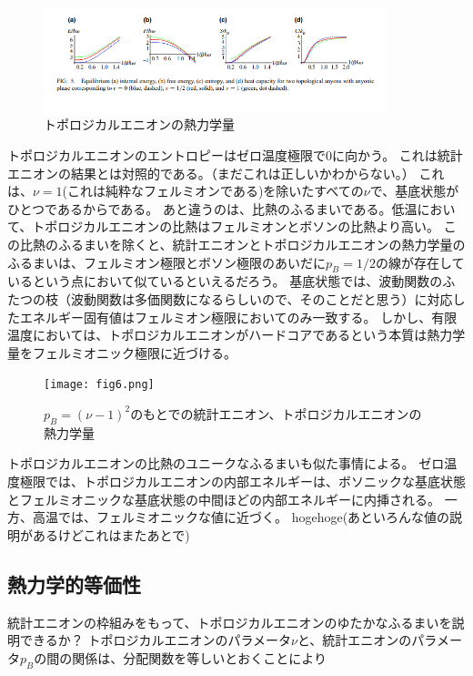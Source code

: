 \documentclass[a4paper,11pt]{jsarticle}
\numberwithin{equation}{section}
\begin{document}
\begin{figure}[htbp]
  \begin{center}
  \includegraphics[width=100mm]{fig5.png}
  \caption{トポロジカルエニオンの熱力学量}
  \end{center}
  \end{figure}

トポロジカルエニオンのエントロピーはゼロ温度極限で0に向かう。
これは統計エニオンの結果とは対照的である。（まだこれは正しいかわからない。）
これは、$\nu=1$(これは純粋なフェルミオンである)を除いたすべての$\nu$で、基底状態がひとつであるからである。
あと違うのは、比熱のふるまいである。低温において、トポロジカルエニオンの比熱はフェルミオンとボソンの比熱より高い。
この比熱のふるまいを除くと、統計エニオンとトポロジカルエニオンの熱力学量のふるまいは、フェルミオン極限とボソン極限のあいだに$p_B=1/2$の線が存在しているという点において似ているといえるだろう。
基底状態では、波動関数のふたつの枝（波動関数は多価関数になるらしいので、そのことだと思う）に対応したエネルギー固有値はフェルミオン極限においてのみ一致する。
しかし、有限温度においては、トポロジカルエニオンがハードコアであるという本質は熱力学量をフェルミオニック極限に近づける。

\begin{figure}[htbp]
  \begin{center}
  \texttt{[image: fig6.png]}
  \caption{$p_B=(\nu-1)^2$のもとでの統計エニオン、トポロジカルエニオンの熱力学量}
  \end{center}
  \end{figure}


トポロジカルエニオンの比熱のユニークなふるまいも似た事情による。
ゼロ温度極限では、トポロジカルエニオンの内部エネルギーは、ボソニックな基底状態とフェルミオニックな基底状態の中間ほどの内部エネルギーに内挿される。
一方、高温では、フェルミオニックな値に近づく。
hogehoge(あといろんな値の説明があるけどこれはまたあとで)

\subsection{熱力学的等価性}
統計エニオンの枠組みをもって、トポロジカルエニオンのゆたかなふるまいを説明できるか？
トポロジカルエニオンのパラメータ$\nu$と、統計エニオンのパラメータ$p_B$の間の関係は、分配関数を等しいとおくことにより
\end{document}
